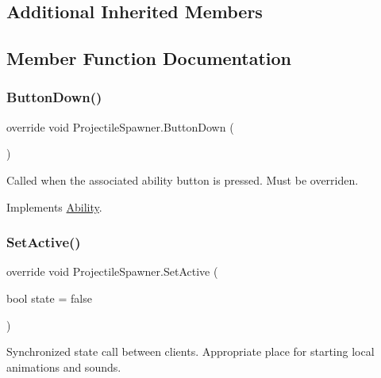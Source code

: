 \subsection*{Additional Inherited Members}


\subsection{Member Function Documentation}
\hypertarget{class_projectile_spawner_a9495a0da1b27877198ccd1d7f7153743}{}\label{class_projectile_spawner_a9495a0da1b27877198ccd1d7f7153743} 
\subsubsection{\texorpdfstring{Button\+Down()}{ButtonDown()}}
{\footnotesize\ttfamily override void Projectile\+Spawner.\+Button\+Down (\begin{DoxyParamCaption}{ }\end{DoxyParamCaption})\hspace{0.3cm}{\ttfamily [virtual]}}



Called when the associated ability button is pressed. Must be overriden. 



Implements \hyperlink{class_ability_a7722265862f8b29828315725415ce266}{Ability}.

\hypertarget{class_projectile_spawner_a9896d21e1871b84380b473e90e1c8640}{}\label{class_projectile_spawner_a9896d21e1871b84380b473e90e1c8640} 
\subsubsection{\texorpdfstring{Set\+Active()}{SetActive()}}
{\footnotesize\ttfamily override void Projectile\+Spawner.\+Set\+Active (\begin{DoxyParamCaption}\item[{bool}]{state = {\ttfamily false} }\end{DoxyParamCaption})\hspace{0.3cm}{\ttfamily [virtual]}}



Synchronized state call between clients. Appropriate place for starting local animations and sounds. 


